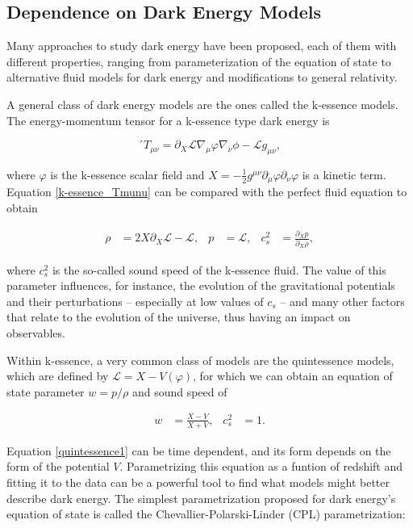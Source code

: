 \documentclass[openany,a4paper,12pt,oneside]{book}
\begin{document}
\begin{spacing}{1.5}
\section{Dependence on Dark Energy Models}\label{sect:dark_energy}

Many approaches to study dark energy have been proposed, each of them with different properties, ranging from parameterization of the equation of state\cite{CPL_DE_parametrization, FSLL_DE_parametrization} to alternative fluid models for dark energy\cite{DEDM_fluid, review_DE_ronaldo} and modifications to general relativity\cite{Brane_cosmo_model}. 

A general class of dark energy models are the ones called the k-essence models. The energy-momentum tensor for a k-essence type dark energy is

\begin{equation}\label{k-essence_Tmunu}
´	T_{\mu\nu}=\partial_X \mathcal{L} \nabla_\mu \varphi \nabla_\nu \phi -\mathcal{L} g_{\mu\nu},
\end{equation}

\noindent where $\varphi$ is the k-essence scalar field and $X=-\frac{1}{2}g^{\mu\nu}\partial_\mu \varphi \partial_\nu \varphi$ is a kinetic term. Equation \eqref{k-essence_Tmunu} can be compared with the perfect fluid equation to obtain

\begin{align}\label{k-essence_results}
	\rho&=2X\partial_X\mathcal{L}-\mathcal{L}, & p&=\mathcal{L}, & c_s^2&=\frac{\partial_X p}{\partial_X \rho},
\end{align}

\noindent where $c_s^2$ is the so-called sound speed of the k-essence fluid. The value of this parameter influences, for instance, the evolution of the gravitational potentials\cite{DE_variable_soundspeed_Linton2018} and their perturbations -- especially at low values of $c_s$ -- and many other factors that relate to the evolution of the universe, thus having an impact on observables. 

Within k-essence, a very common class of models are the quintessence models, which are defined by $\mathcal{L}=X-V(\varphi)$, for which we can obtain an equation of state parameter $w=p/\rho$ and sound speed of

\begin{align}\label{quintessence1}
	w&=\frac{X-V}{X+V}, & c_s^2&=1.
\end{align}

Equation \eqref{quintessence1} can be time dependent, and its form depends on the form of the potential $V$. Parametrizing this equation as a funtion of redshift and fitting it to the data can be a powerful tool to find what models might better describe dark energy. The simplest parametrization proposed for dark energy's equation of state is called the Chevallier-Polarski-Linder (CPL) parametrization\cite{CPL_DE_parametrization,DE_models}:


\end{spacing}
\end{document}
